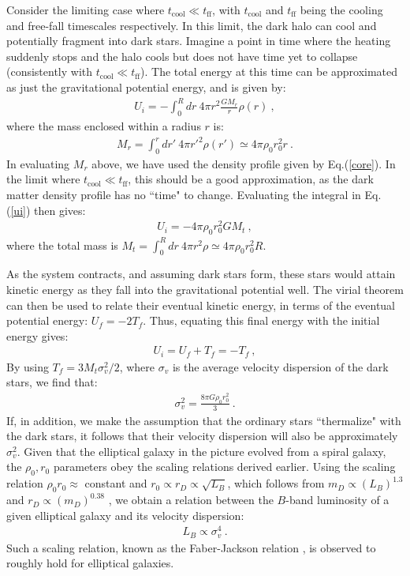 \documentclass[12pt]{article}
\begin{document}
{{Consider the limiting case where $t _{\text{cool}} \ll t _{\text{ff}}$,
with $t _{\text{cool}}$ and $t _{\text{ff}}$ being the cooling and
free-fall timescales respectively. In this limit, the dark halo can cool
and potentially fragment into dark stars. Imagine a point in time where
the heating suddenly stops and the halo cools but does not have time yet
to collapse (consistently with $t _{\text{cool}} \ll t _{\text{ff}}$).
The total energy at this time can be approximated as just the
gravitational potential energy, and is given by:
%
\begin{eqnarray}
U _i = -\int _0 ^R dr \ 4\pi r^2 \frac{GM_r}{r}\rho (r) \ ,
\label{ui}
\end{eqnarray}
%
where the mass enclosed within a radius $r$ is:
%
\begin{eqnarray}
M_r = \int _0 ^r dr' \ 4\pi {r'} ^2\rho (r') \simeq 4\pi \rho _0r _0 ^2
r \ .
\end{eqnarray}
%
In evaluating $M_r$ above, we have used the density profile given by
Eq.(\ref{core}).  In the limit where $t _{\text{cool}} \ll t
_{\text{ff}}$, this should be a good approximation, as the dark matter
density profile has no ``time" to change. Evaluating the integral in
Eq.(\ref{ui}) then gives:
%
\begin{eqnarray}
U _i = -4\pi \rho _0r _0 ^2 GM _t \ ,
\end{eqnarray}
%
where the total mass is $M _t = \int _0 ^R dr \ 4\pi r ^2 \rho \simeq
4\pi \rho _0r _0 ^2R$. 

As the system contracts, and assuming dark stars form, these stars would
attain kinetic energy as they fall into the gravitational potential
well. The virial theorem can then be used to relate their eventual
kinetic energy, in terms of the eventual potential energy: $U _f = -2T
_f$. Thus, equating this final energy with the initial energy gives:
%
\begin{eqnarray}
U _i = U _f + T _f = -T _f \ ,
\end{eqnarray}
%
By using $T _f = 3M _t\sigma _v ^2/2$, where $\sigma_v$ is the average
velocity dispersion of the dark stars, we find that:
\begin{eqnarray}
\sigma _v ^2 = \frac{8\pi G\rho _0r _0 ^2}{3} \ .
\end{eqnarray}
%
If, in addition, we make the assumption that the ordinary stars
``thermalize" with the dark stars, it follows that their velocity
dispersion will also be approximately $\sigma _v ^2$. Given that the
elliptical galaxy in the picture evolved from a spiral galaxy, the
$\rho_0, r_0$ parameters obey the scaling relations derived earlier.
Using the scaling relation $\rho _0r _0 \approx$ constant and $r _0
\propto r _D \propto \sqrt{L _B}$, which follows from $m _D \propto
\left ( L _B \right ) ^{1.3}$ \cite{shankar} and $r_D \propto \left ( m
_D \right ) ^{0.38}$ \cite{saluccird}, we obtain a relation between the
$B$-band luminosity of a given elliptical galaxy and its velocity
dispersion:
%
\begin{eqnarray}
L _B \propto \sigma _v ^4 \ .
\end{eqnarray}
%
Such a scaling relation, known as the Faber-Jackson relation
\cite{faberjackson}, is observed to roughly hold for elliptical
galaxies.

}}
\end{document}
